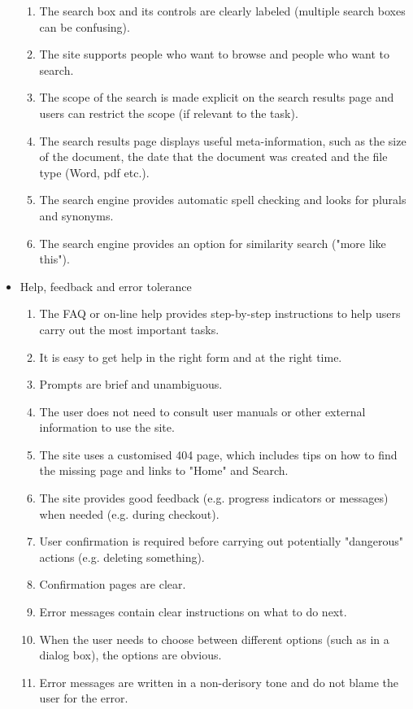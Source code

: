 \begin{itemize}
\begin{enumerate}
        \item The search box and its controls are clearly labeled (multiple search boxes can be confusing).
        \item The site supports people who want to browse and people who want to search.
        \item The scope of the search is made explicit on the search results page and users can restrict the scope (if relevant to the task).
        \item The search results page displays useful meta-information, such as the size of the document, the date that the document was created and the file type (Word, pdf etc.).
        \item The search engine provides automatic spell checking and looks for plurals and synonyms.
        \item The search engine provides an option for similarity search ("more like this").        
      \end{enumerate}
  \item Help, feedback and error tolerance
      \begin{enumerate}
        \item The FAQ or on-line help provides step-by-step instructions to help users carry out the most important tasks.
        \item It is easy to get help in the right form and at the right time.
        \item Prompts are brief and unambiguous.
        \item The user does not need to consult user manuals or other external information to use the site.
        \item The site uses a customised 404 page, which includes tips on how to find the missing page and links to "Home" and Search.
        \item The site provides good feedback (e.g. progress indicators or messages) when needed (e.g. during checkout).
        \item User confirmation is required before carrying out potentially "dangerous" actions (e.g. deleting something).
        \item Confirmation pages are clear.
        \item Error messages contain clear instructions on what to do next.
        \item When the user needs to choose between different options (such as in a dialog box), the options are obvious.
        \item Error messages are written in a non-derisory tone and do not blame the user for the error.

\end{enumerate}
\end{itemize}
